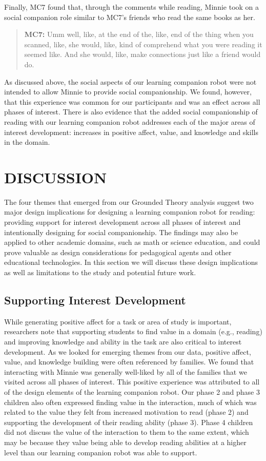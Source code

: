 \documentclass{sigchi}
\begin{document}
 Finally, MC7 found that, through the comments while reading, Minnie took on a social companion role similar to MC7's friends who read the same books as her.
 
	 \begin{quote}
	 	 \textbf{MC7:} Umm well, like, at the end of the, like, end of the thing when you scanned, like, she would, like, kind of comprehend what you were reading it seemed like. And she would, like, make connections just like a friend would do. 
	 \end{quote}
 
As discussed above, the social aspects of our learning companion robot were not intended to allow Minnie to provide social companionship. We found, however, that this experience was common for our participants and was an effect across all phases of interest. There is also evidence that the added social companionship of reading with our learning companion robot addresses each of the major areas of interest development: increases in positive affect, value, and knowledge and skills in the domain.


\section{DISCUSSION}
The four themes that emerged from our Grounded Theory analysis suggest two major design implications for designing a learning companion robot for reading: providing support for interest development across all phases of interest and intentionally designing for social companionship. The findings may also be applied to other academic domains, such as math or science education, and could prove valuable as design considerations for pedagogical agents and other educational technologies. In this section we will discuss these design implications as well as limitations to the study and potential future work.

\subsection{Supporting Interest Development}
While generating positive affect for a task or area of study is important, researchers note that supporting students to find value in a domain (e.g., reading) and improving knowledge and ability in the task are also critical to interest development. As we looked for emerging themes from our data, positive affect, value, and knowledge building were often referenced by families. We found that interacting with Minnie was generally well-liked by all of the families that we visited across all phases of interest. This positive experience was attributed to all of the design elements of the learning companion robot. Our phase 2 and phase 3 children also often expressed finding value in the interaction, much of which was related to the value they felt from increased motivation to read (phase 2) and supporting the development of their reading ability (phase 3). Phase 4 children did not discuss the value of the interaction to them to the same extent, which may be because they value being able to develop reading abilities at a higher level than our learning companion robot was able to support. 
\end{document}
